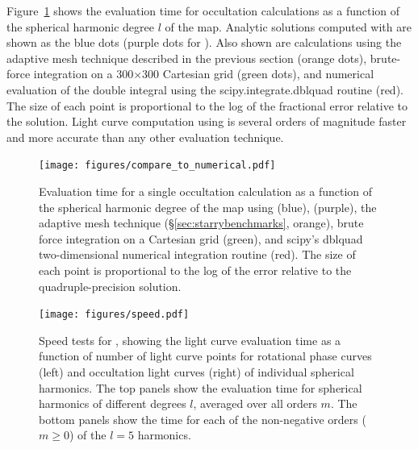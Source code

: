 \documentclass[modern]{aastex61}
\begin{document}
Figure~\ref{fig:compare_to_numerical} shows the evaluation time for
occultation calculations as a function of the spherical
harmonic degree $l$ of the map. Analytic solutions computed with \starry
are shown as the blue dots (purple dots for \starrygrad). Also shown are calculations using the adaptive
mesh technique described in the previous section (orange dots),
brute-force integration on a 300$\times$300 Cartesian grid (green dots),
and numerical evaluation of the double integral using the
\textsf{scipy.integrate.dblquad} \citep{scipy} routine (red). The size of each point
is proportional to the log of the fractional error relative to the
\starry solution. Light curve computation using \starry is several orders of
magnitude faster and more accurate than any other evaluation technique.

\begin{figure}[t!]
    \begin{centering}
    \texttt{[image: figures/compare\_to\_numerical.pdf]}
    \caption{\label{fig:compare_to_numerical}
             Evaluation time for a single occultation calculation as a function
             of the spherical harmonic degree of the map using
             \starry (blue), \starrygrad (purple), the adaptive mesh technique (\S\ref{sec:starrybenchmarks}, orange),
             brute force integration on a Cartesian grid (green), and
             \textsf{scipy}'s \textsf{dblquad} two-dimensional numerical
             integration routine (red).
             The size of each point is proportional to the log of the error relative
             to the \starry quadruple-precision solution.
             }
    \end{centering}
\end{figure}

\begin{figure}[p!]
    \begin{centering}
    \texttt{[image: figures/speed.pdf]}
    \caption{\label{fig:speed}
             Speed tests for \starry, showing the light curve evaluation time
             as a function of number of light curve points for rotational
             phase curves (left) and occultation light curves (right) of individual
             spherical harmonics. The top
             panels show the evaluation time for spherical harmonics of different
             degrees $l$, averaged over all orders $m$. The bottom panels
             show the time for each of the non-negative orders ($m \ge 0$)
             of the $l = 5$ harmonics.
             }
    \end{centering}
\end{figure}
\end{document}
